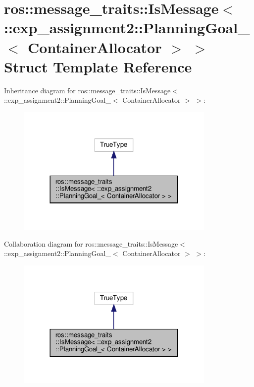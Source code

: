 \hypertarget{structros_1_1message__traits_1_1IsMessage_3_01_1_1exp__assignment2_1_1PlanningGoal___3_01ContainerAllocator_01_4_01_4}{}\section{ros\+:\+:message\+\_\+traits\+:\+:Is\+Message$<$ \+:\+:exp\+\_\+assignment2\+:\+:Planning\+Goal\+\_\+$<$ Container\+Allocator $>$ $>$ Struct Template Reference}
\label{structros_1_1message__traits_1_1IsMessage_3_01_1_1exp__assignment2_1_1PlanningGoal___3_01ContainerAllocator_01_4_01_4}


Inheritance diagram for ros\+:\+:message\+\_\+traits\+:\+:Is\+Message$<$ \+:\+:exp\+\_\+assignment2\+:\+:Planning\+Goal\+\_\+$<$ Container\+Allocator $>$ $>$\+:
\nopagebreak
\begin{figure}[H]
\begin{center}
\leavevmode
\includegraphics[width=273pt]{structros_1_1message__traits_1_1IsMessage_3_01_1_1exp__assignment2_1_1PlanningGoal___3_01Contain050732f6f8b1b081f80007d2bc471a2a}
\end{center}
\end{figure}


Collaboration diagram for ros\+:\+:message\+\_\+traits\+:\+:Is\+Message$<$ \+:\+:exp\+\_\+assignment2\+:\+:Planning\+Goal\+\_\+$<$ Container\+Allocator $>$ $>$\+:
\nopagebreak
\begin{figure}[H]
\begin{center}
\leavevmode
\includegraphics[width=273pt]{structros_1_1message__traits_1_1IsMessage_3_01_1_1exp__assignment2_1_1PlanningGoal___3_01Containde7e5609c6363945d40a880f219ebdb9}
\end{center}
\end{figure}


